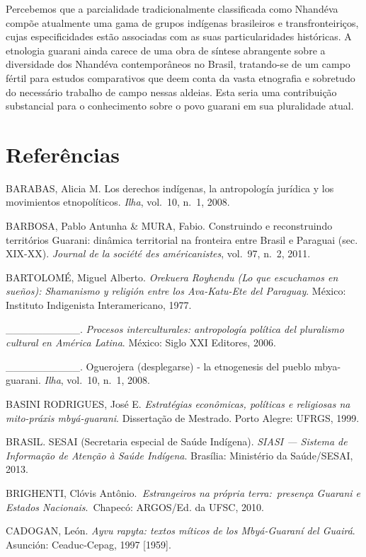 

Percebemos que a parcialidade tradicionalmente classificada como
Nhandéva compõe atualmente uma gama de grupos indígenas brasileiros e
transfronteiriços, cujas especificidades estão associadas com as suas
particularidades históricas. A etnologia guarani ainda carece de uma
obra de síntese abrangente sobre a diversidade dos Nhandéva
contemporâneos no Brasil, tratando-se de um campo fértil para estudos
comparativos que deem conta da vasta etnografia e sobretudo do
necessário trabalho de campo nessas aldeias. Esta seria uma
contribuição substancial para o conhecimento sobre o povo guarani em
sua pluralidade atual. 

\section{Referências}

BARABAS, Alicia M. Los derechos indígenas, la antropología jurídica y
los movimientos etnopolíticos. \emph{Ilha}, vol.~10, n.~1, 2008.

BARBOSA, Pablo Antunha \& MURA, Fabio. Construindo e reconstruindo
territórios Guarani: dinâmica territorial na fronteira entre Brasil e
Paraguai (sec. XIX-XX). \emph{Journal de la société des américanistes}, vol.~97, n.~2,
2011. 

BARTOLOMÉ, Miguel Alberto. \emph{Orekuera Royhendu (Lo que escuchamos en
sueños): Shamanismo y religión entre los Ava-Katu-Ete del Paraguay}.
México: Instituto Indigenista Interamericano, 1977.

\_\_\_\_\_\_\_\_\_\_. \emph{Procesos interculturales: antropología política
del pluralismo cultural en América Latina}. México: Siglo XXI Editores,
2006.

\_\_\_\_\_\_\_\_\_\_. Oguerojera (desplegarse) - la etnogenesis del
pueblo mbya-guarani. \emph{Ilha}, vol.~10, n.~1, 2008.

BASINI RODRIGUES, José E. \emph{Estratégias econômicas, políticas e religiosas
na mito-práxis mbyá-guarani}. Dissertação de Mestrado. Porto Alegre:
UFRGS, 1999.

BRASIL. SESAI (Secretaria especial de Saúde Indígena). \emph{SIASI — Sistema
de Informação de Atenção à Saúde Indígena}. Brasília: Ministério da
Saúde/SESAI, 2013.

BRIGHENTI, Clóvis Antônio.\emph{~Estrangeiros na própria terra:~presença
Guarani e Estados Nacionais}.~Chapecó: ARGOS/Ed. da UFSC, 2010. 

CADOGAN, León. \emph{Ayvu rapyta: textos míticos de los Mbyá-Guaraní del
Guairá}. Asunción: Ceaduc-Cepag, 1997 [1959].

